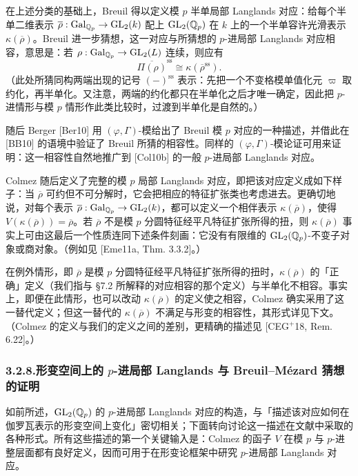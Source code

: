 在上述分类的基础上，Breuil 得以定义模 $p$ 半单局部 Langlands 对应：给每个半单二维表示 $\overline{\rho}:\operatorname{Gal}_{\mathbb{Q}_p}\to\mathrm{GL}_2(k)$ 配上 $\mathrm{GL}_2(\mathbb{Q}_p)$ 在 $k$ 上的一个半单容许光滑表示 $\kappa(\overline{\rho})$。Breuil 进一步猜想，这一对应与所猜想的 $p$-进局部 Langlands 对应相容，意思是：若 $\rho:\operatorname{Gal}_{\mathbb{Q}_p}\to\mathrm{GL}_2(L)$ 连续，则应有
\[
\overline{\Pi(\rho)}^{\mathrm{ss}}\cong\kappa(\overline{\rho}^{\mathrm{ss}}).
\]
（此处所猜同构两端出现的记号 $(-)^{\mathrm{ss}}$ 表示：先把一个不变格模单值化元 $\varpi$ 取约化，再半单化。又注意，两端的约化都只在半单化之后才唯一确定，因此把 $p$-进情形与模 $p$ 情形作此类比较时，过渡到半单化是自然的。）

随后 Berger [Ber10] 用 $(\varphi,\Gamma)$-模给出了 Breuil 模 $p$ 对应的一种描述，并借此在 [BB10] 的语境中验证了 Breuil 所猜的相容性。同样的 $(\varphi,\Gamma)$-模论证可用来证明：这一相容性自然地推广到 [Col10b] 的一般 $p$-进局部 Langlands 对应。

Colmez 随后定义了完整的模 $p$ 局部 Langlands 对应，即把该对应定义成如下样子：当 $\overline{\rho}$ 可约但不可分解时，它会把相应的特征扩张类也考虑进去。更确切地说，对每个表示 $\overline{\rho}:\operatorname{Gal}_{\mathbb{Q}_p}\to\mathrm{GL}_2(k)$，都可以定义一个相伴表示 $\kappa(\overline{\rho})$，使得 $V(\kappa(\overline{\rho}))=\overline{\rho}$。若 $\overline{\rho}$ 不是模 $p$ 分圆特征经平凡特征扩张所得的扭，则 $\kappa(\overline{\rho})$ 事实上可由这最后一个性质连同下述条件刻画：它没有有限维的 $\mathrm{GL}_2(\mathbb{Q}_p)$-不变子对象或商对象。（例如见 [Eme11a, Thm. 3.3.2]。）

在例外情形，即 $\overline{\rho}$ 是模 $p$ 分圆特征经平凡特征扩张所得的扭时，$\kappa(\overline{\rho})$ 的「正确」定义（我们指与 §7.2 所解释的对应相容的那个定义）与半单化不相容。事实上，即便在此情形，也可以改动 $\kappa(\overline{\rho})$ 的定义使之相容，Colmez 确实采用了这一替代定义；但这一替代的 $\kappa(\overline{\rho})$ 不满足与形变的相容性，其形式详见下文。（Colmez 的定义与我们的定义之间的差别，更精确的描述见 [CEG$^+$18, Rem. 6.22]。）

\subsubsection*{3.2.8.\quad 形变空间上的 $p$-进局部 Langlands 与 Breuil--Mézard 猜想的证明}

如前所述，$\mathrm{GL}_2(\mathbb{Q}_p)$ 的 $p$-进局部 Langlands 对应的构造，与「描述该对应如何在伽罗瓦表示的形变空间上变化」密切相关；下面转向讨论这一描述在文献中采取的各种形式。所有这些描述的第一个关键输入是：Colmez 的函子 $V$ 在模 $p$ 与 $p$-进整层面都有良好定义，因而可用于在形变论框架中研究 $p$-进局部 Langlands 对应。

